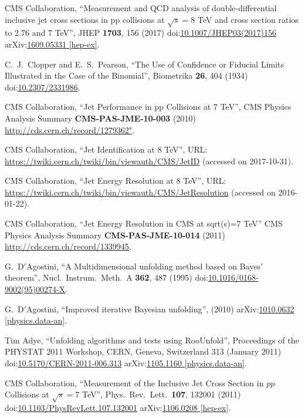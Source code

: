 \begin{thebibliography}{99}

CMS Collaboration, ``Measurement and QCD analysis of double-differential inclusive jet cross sections in pp collisions at $ \sqrt{s}=8 $ TeV and cross section ratios to 2.76 and 7 TeV'', JHEP {\bf 1703}, 156 (2017) doi:\href{http://dx.doi.org/10.1007/JHEP03(2017)156}{10.1007/JHEP03(2017)156} arXiv:\href{https://arxiv.org/abs/1609.05331}{1609.05331 [hep-ex]}.

C.~J.~Clopper and E.~S.~Pearson, ``The Use of Confidence or Fiducial Limits Illustrated in the Case of the Binomial'', Biometrika {\bf 26}, 404 (1934) doi:\href{http://www.jstor.org/stable/2331986}{10.2307/2331986}.

CMS Collaboration, ``Jet Performance in pp Collisions at 7 TeV'', CMS Physics Analysis Summary {\bf CMS-PAS-JME-10-003} (2010) \url{http://cds.cern.ch/record/1279362"}.

CMS Collaboration, ``Jet Identification at 8 TeV'', URL: \url{https://twiki.cern.ch/twiki/bin/viewauth/CMS/JetID} (accessed on 2017-10-31).

CMS Collaboration, ``Jet Energy Resolution at 8 TeV'', URL: \url{https://twiki.cern.ch/twiki/bin/viewauth/CMS/JetResolution} (accessed on 2016-01-22).

CMS Collaboration, ``Jet Energy Resolution in CMS at sqrt(s)=7 TeV'' CMS Physics Analysis Summary {\bf CMS-PAS-JME-10-014} (2011) \url {http://cds.cern.ch/record/1339945}.

G.~D$'$Agostini, ``A Multidimensional unfolding method based on Bayes$'$ theorem'', Nucl.\ Instrum.\ Meth.\ A {\bf 362}, 487 (1995) doi:\href{http://dx.doi.org/10.1016/0168-9002(95)00274-X}{10.1016/0168-9002(95)00274-X}.

G.~D$'$Agostini, ``Improved iterative Bayesian unfolding'', (2010) arXiv:\href{https://arxiv.org/abs/1010.0632}{1010.0632 [physics.data-an]}.

Tim Adye, ``Unfolding algorithms and tests using RooUnfold'', Proceedings of the PHYSTAT 2011 Workshop, CERN, Geneva, Switzerland 313 (January 2011) doi:\href{http://dx.doi.org/10.5170/CERN-2011-006.313}{10.5170/CERN-2011-006.313} arXiv:\href{https://arxiv.org/abs/1105.1160}{1105.1160 [physics.data-an]}.

CMS Collaboration, ``Measurement of the Inclusive Jet Cross Section in $pp$ Collisions at $\sqrt{s}=7$ TeV'', Phys.\ Rev.\ Lett.\ {\bf 107}, 132001 (2011) doi:\href{https://doi.org/10.1103/PhysRevLett.107.132001}{10.1103/PhysRevLett.107.132001} arXiv:\href{https://arxiv.org/abs/1106.0208}{1106.0208 [hep-ex]}.


\end{thebibliography}
